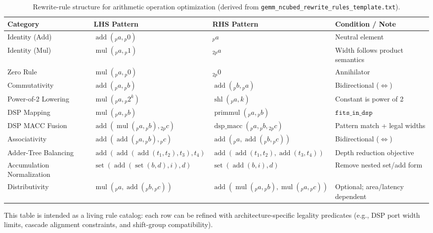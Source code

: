 \begin{table}[t]
\centering
\small
\caption{Rewrite-rule structure for arithmetic operation optimization (derived from \texttt{gemm\_ncubed\_rewrite\_rules\_template.txt}).}
\label{tab:arithv-rewrite-rules}
\begin{tabular}{p{} p{} p{} p{}}
\hline
\textbf{Category} & \textbf{LHS Pattern} & \textbf{RHS Pattern} & \textbf{Condition / Note} \\
\hline
Identity (Add) & $\operatorname{add}({}_p a, {}_p 0)$ & ${}_p a$ & Neutral element \\
Identity (Mul) & $\operatorname{mul}({}_p a, {}_p 1)$ & ${}_{2p} a$ & Width follows product semantics \\
Zero Rule & $\operatorname{mul}({}_p a, {}_p 0)$ & ${}_{2p} 0$ & Annihilator \\
Commutativity & $\operatorname{add}({}_p a, {}_p b)$ & $\operatorname{add}({}_p b, {}_p a)$ & Bidirectional ($\Leftrightarrow$) \\
Power-of-2 Lowering & $\operatorname{mul}({}_p a, {}_p 2^k)$ & $\operatorname{shl}({}_p a, k)$ & Constant is power of 2 \\
DSP Mapping & $\operatorname{mul}({}_p a, {}_p b)$ & $\operatorname{primmul}({}_p a, {}_p b)$ & $\texttt{fits\_in\_dsp}$ \\
DSP MACC Fusion & $\operatorname{add}(\operatorname{mul}({}_p a, {}_p b), {}_{2p} c)$ & $\operatorname{dsp\_macc}({}_p a, {}_p b, {}_{2p} c)$ & Pattern match + legal widths \\
Associativity & $\operatorname{add}(\operatorname{add}({}_p a, {}_p b), {}_p c)$ & $\operatorname{add}({}_p a, \operatorname{add}({}_p b, {}_p c))$ & Bidirectional ($\Leftrightarrow$) \\
Adder-Tree Balancing & $\operatorname{add}(\operatorname{add}(\operatorname{add}(t_1,t_2),t_3),t_4)$ & $\operatorname{add}(\operatorname{add}(t_1,t_2),\operatorname{add}(t_3,t_4))$ & Depth reduction objective \\
Accumulation Normalization & $\operatorname{set}(\operatorname{add}(\operatorname{set}(b,d),i),d)$ & $\operatorname{set}(\operatorname{add}(b,i),d)$ & Remove nested set/add form \\
Distributivity & $\operatorname{mul}({}_p a, \operatorname{add}({}_p b, {}_p c))$ & $\operatorname{add}(\operatorname{mul}({}_p a, {}_p b),\operatorname{mul}({}_p a, {}_p c))$ & Optional; area/latency dependent \\
\hline
\end{tabular}
\end{table}

\noindent
This table is intended as a living rule catalog: each row can be refined with architecture-specific legality predicates (e.g., DSP port width limits, cascade alignment constraints, and shift-group compatibility).
